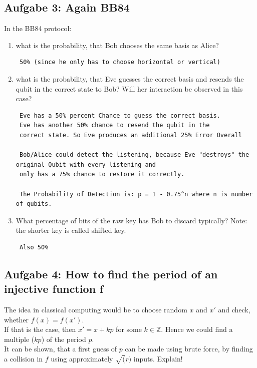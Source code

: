 \documentclass[11pt]{article}
\begin{document}
\newpage

    \hypertarget{aufgabe-3-again-bb84}{%
\subsection{Aufgabe 3: Again BB84}\label{aufgabe-3-again-bb84}}

In the BB84 protocol:

\begin{enumerate}
\def\labelenumi{\arabic{enumi}.}
\item
  what is the probability, that Bob chooses the same basis as Alice?

\begin{verbatim}
 50% (since he only has to choose horizontal or vertical)
\end{verbatim}
\item
  what is the probability, that Eve guesses the correct basis and
  resends the qubit in the correct state to Bob? Will her interaction be
  observed in this case?

\begin{verbatim}
 Eve has a 50% percent Chance to guess the correct basis.
 Eve has another 50% chance to resend the qubit in the
 correct state. So Eve produces an additional 25% Error Overall

 Bob/Alice could detect the listening, because Eve "destroys" the original Qubit with every listening and
 only has a 75% chance to restore it correctly.

 The Probability of Detection is: p = 1 - 0.75^n where n is number of qubits.
\end{verbatim}
\item
  What percentage of bits of the raw key has Bob to discard typically?
  Note: the shorter key is called shifted key.

\begin{verbatim}
 Also 50%
\end{verbatim}
\end{enumerate}

    \hypertarget{aufgabe-4-how-to-find-the-period-of-an-injective-function-f}{%
\subsection{Aufgabe 4: How to find the period of an injective function
f}\label{aufgabe-4-how-to-find-the-period-of-an-injective-function-f}}

The idea in classical computing would be to choose random \(x\) and
\(x'\) and check, whether \(f (x) = f (x')\).\\
If that is the case, then \(x' = x+kp\) for some \(k \in \mathbb{Z}\).
Hence we could find a multiple (\(kp\)) of the period \(p\).\\
It can be shown, that a first guess of \(p\) can be made using brute
force, by finding a collision in \(f\) using approximately \(\sqrt(r)\)
inputs. Explain!
\end{document}
